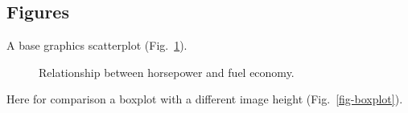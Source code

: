 \documentclass[
  letterpaper,
  DIV=11,
  numbers=noendperiod]{scrartcl}
\begin{document}
\subsection{Figures}\label{sec-figures}

A base graphics scatterplot (Fig.~\ref{fig-base}).

\begin{figure}


\caption{\label{fig-base}Relationship between horsepower and fuel
economy.}

\end{figure}%

Here for comparison a boxplot with a different image height
(Fig.~\ref{fig-boxplot}).
\end{document}

